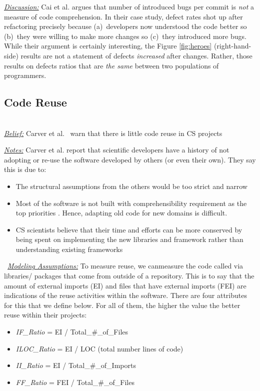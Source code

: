 \documentclass[sigconf,review,anonymous]{acmart}
\newcommand{\bi}{\begin{itemize}}
\newcommand{\ei}{\end{itemize}}
\begin{document}
\noindent \textit{\underline{Discussion:}} 
Cai et al. \cite{cai19_debt} argues that number of introduced bugs
per commit is {\em not} a measure of code comprehension.
In their case study, defect rates shot up after refactoring
precisely because (a)~developers now understood the code better so (b)~they were willing to make more changes so (c)~they
introduced more bugs. While their argument is certainly interesting, the Figure \ref{fig:heroes} (right-hand-side) results
are not a statement of defects {\em increased} after changes.
Rather, those results on defects ratios that are {\em the same} between two populations of programmers. 




\subsection{Code Reuse} ~\\
\noindent \textit{\underline{Belief:}} 
Carver et al.~\cite{segal07_problem, carver06_hpc, Shull05_parallel, sanders08_risk} warn that there is little
code reuse in CS projects

\noindent \textit{\underline{Notes:}} 
Carver et al. report that scientific developers have a history of not adopting or re-use the software developed by others (or even their own). They 
say this is due to:

\bi
\item The structural assumptions from the others would be too strict and narrow \cite{carver06_hpc, basili08_hpc}
\item Most of the software is not built with comprehensibility requirement as the top priorities \cite{segal07_problem}. Hence, adapting old code for new domains is difficult.
\item
CS scientists believe that their time and efforts can be more conserved by being spent on implementing the new libraries and framework rather than understanding existing frameworks
\ei
\noindent ~\textit{\underline{Modeling Assumptions:}} To
measure reuse, we canmeasure the  code called
via libraries/ packages that come from outside of a repository. This is to say that the amount of external imports (EI) and files that have external imports (FEI) are indications of the reuse activities within the software. There are four attributes for this that we define below. For all of them, the higher the value the better reuse within their projects: 

\bi
\item \textit{IF\_Ratio} = EI / Total\_\#\_of\_Files
\item \textit{ILOC\_Ratio} = EI / LOC (total number lines of code)
\item \textit{II\_Ratio} = EI / Total\_\#\_of\_Imports 
\item \textit{FF\_Ratio} = FEI / Total\_\#\_of\_Files
\ei
\end{document}
